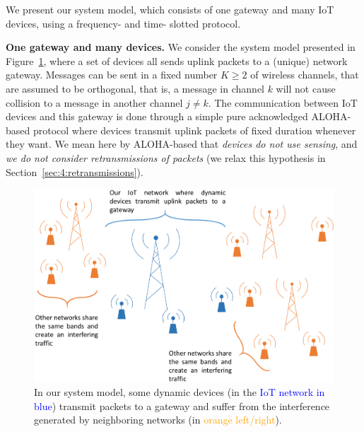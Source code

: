 We present our system model, which consists of one gateway and many IoT devices, using a frequency- and time- slotted protocol.

\textbf{One gateway and many devices.}
%
We consider the system model presented in Figure~\ref{fig:41:system_model1}, where a set of devices all sends uplink packets to a (unique) network gateway.
Messages can be sent in a fixed number $K\geq2$ of wireless channels,
that are assumed to be orthogonal, that is, a message in channel $k$ will not cause collision to a message in another channel $j \neq k$.
The communication between IoT devices and this gateway is done through a simple pure acknowledged ALOHA-based protocol where devices transmit uplink packets of fixed duration whenever they want.
We mean here by ALOHA-based that \emph{devices do not use sensing}, and \emph{we do not consider retransmissions of packets} (we relax this hypothesis in Section~\ref{sec:4:retransmissions}).
%

\begin{figure}[!h]
    \centering
    \includegraphics[width=0.70\linewidth]{system_model1.eps}
    \caption[In our system model, some dynamic devices (in the IoT network) transmit packets to a gateway and suffer from the interference generated by neighboring networks.]{In our system model, some dynamic devices (in the \textcolor{blue}{IoT network in blue}) transmit packets to a gateway and suffer from the interference generated by neighboring networks (in \textcolor{orange}{orange left/right}).}
    \label{fig:41:system_model1}
\end{figure}

